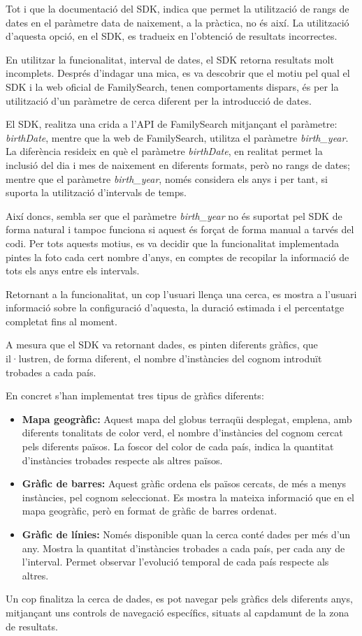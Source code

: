     Tot i que la documentació del SDK, indica que permet la utilització de rangs de dates en el paràmetre data de naixement, a la pràctica, no és així. La utilització d'aquesta opció, en el SDK, es tradueix en l’obtenció de resultats incorrectes.

    En utilitzar la funcionalitat, interval de dates, el SDK retorna resultats molt incomplets. Després d'indagar una mica, es va descobrir que el motiu pel qual el SDK i la web oficial de FamilySearch, tenen comportaments dispars, és per la utilització d’un paràmetre de cerca diferent per la introducció de dates.

    El SDK, realitza una crida a l'API de FamilySearch mitjançant el paràmetre: \emph{birthDate}, mentre que la web de FamilySearch, utilitza el paràmetre \emph{birth\_year}. La diferència resideix en què el paràmetre \emph{birthDate}, en realitat permet la inclusió del dia i mes de naixement en diferents formats, però no rangs de dates; mentre que el paràmetre \emph{birth\_year}, només considera els anys i per tant, si suporta la utilització d’intervals de temps.

    Així doncs, sembla ser que el paràmetre \emph{birth\_year} no és suportat pel SDK de forma natural i tampoc funciona si aquest és forçat de forma manual a tarvés del codi. Per tots aquests motius, es va decidir que la funcionalitat implementada pintes la foto cada cert nombre d'anys, en comptes de recopilar la informació de tots els anys entre els intervals.

    Retornant a la funcionalitat, un cop l’usuari llença una cerca, es mostra a l'usuari informació sobre la configuració d'aquesta, la duració estimada i el percentatge completat fins al moment.

    A mesura que el SDK va retornant dades, es pinten diferents gràfics, que il·lustren, de forma diferent, el nombre d'instàncies del cognom introduït trobades a cada país.

    En concret s’han implementat tres tipus de gràfics diferents:

    \begin{itemize}
        \item \textbf{Mapa geogràfic:} Aquest mapa del globus terraqüi desplegat, emplena, amb diferents tonalitats de color verd, el nombre d’instàncies del cognom cercat pels diferents països. La foscor del color de cada país, indica la quantitat d'instàncies trobades respecte als altres països.
        \item \textbf{Gràfic de barres:} Aquest gràfic ordena els països cercats, de més a menys instàncies, pel cognom seleccionat. Es mostra la mateixa informació que en el mapa geogràfic, però en format de gràfic de barres ordenat.
        \item \textbf{Gràfic de línies:} Només disponible quan la cerca conté dades per més d'un any. Mostra la quantitat d'instàncies trobades a cada país, per cada any de l’interval. Permet observar l'evolució temporal de cada país respecte als altres.
    \end{itemize}

    Un cop finalitza la cerca de dades, es pot navegar pels gràfics dels diferents anys, mitjançant uns controls de navegació específics, situats al capdamunt de la zona de resultats.
